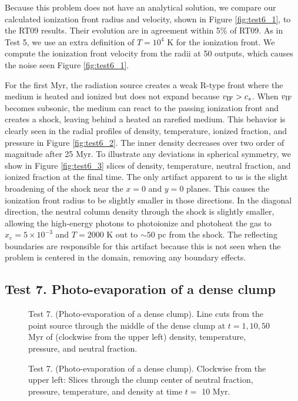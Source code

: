 \documentclass[useAMS,usenatbib,a4paper]{mn2e}
\begin{document}
Because this problem does not have an analytical solution, we compare
our calculated ionization front radius and velocity, shown in Figure
\ref{fig:test6_1}, to the RT09 results.  Their evolution are in
agreement within 5\% of RT09.  As in Test 5, we use an extra
definition of $T=10^4$ K for the ionization front.  We compute the
ionization front velocity from the radii at 50 outputs, which causes
the noise seen Figure \ref{fig:test6_1}.

For the first Myr, the radiation source creates a weak R-type front
where the medium is heated and ionized but does not expand because
$v_{\rm IF} > c_s$.  When $v_{\rm IF}$ becomes subsonic, the medium
can react to the passing ionization front and creates a shock, leaving
behind a heated an rarefied medium.  This behavior is clearly seen in
the radial profiles of density, temperature, ionized fraction, and
pressure in Figure \ref{fig:test6_2}.  The inner density decreases
over two order of magnitude after 25 Myr.  To illustrate any
deviations in spherical symmetry, we show in Figure \ref{fig:test6_3}
slices of density, temperature, neutral fraction, and ionized fraction
at the final time.  The only artifact apparent to us is the slight
broadening of the shock near the $x=0$ and $y=0$ planes.  This causes
the ionization front radius to be slightly smaller in those
directions.  In the diagonal direction, the neutral column density
through the shock is slightly smaller, allowing the high-energy
photons to photoionize and photoheat the gas to $x_e = 5 \times
10^{-3}$ and $T = 2000$ K out to $\sim50$ pc from the shock.  The
reflecting boundaries are responsible for this artifact because this
is not seen when the problem is centered in the domain, removing any
boundary effects.

\subsection{Test 7. Photo-evaporation of a dense clump}

\begin{figure}
  \caption{\label{fig:test7_1} Test 7. (Photo-evaporation of a dense
    clump).  Line cuts from the point source through the middle of the
    dense clump at $t = 1, 10, 50$ Myr of (clockwise from the upper
    left) density, temperature, pressure, and neutral fraction.}
\end{figure}

\begin{figure*}
  \caption{\label{fig:test7_2} Test 7. (Photo-evaporation of a dense
    clump).  Clockwise from the upper left: Slices through the clump
    center of neutral fraction, pressure, temperature, and density at
    time $t =$ 10 Myr.}
\end{figure*}
\end{document}
